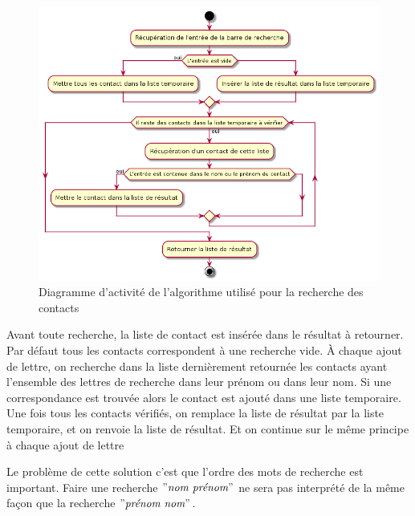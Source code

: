 \begin{figure}[!h]
	\centering
	\includegraphics[scale=0.6]{img/activity_retrieve_new.png}
	\caption{\label{activity_retrieve_new} {Diagramme d'activité de l'algorithme utilisé pour la recherche des contacts}}
\end{figure}

Avant toute recherche, la liste de contact est insérée dans le résultat à retourner. Par défaut tous les contacts correspondent à une recherche vide. À chaque ajout de lettre, on recherche dans la liste dernièrement retournée les contacts ayant l'ensemble des lettres de recherche dans leur prénom ou dans leur nom. Si une correspondance est trouvée alors le contact est ajouté dans une liste temporaire. Une fois tous les contacts vérifiés, on remplace la liste de résultat par la liste temporaire, et on renvoie la liste de résultat. Et on continue sur le même principe à chaque ajout de lettre

\newpage

Le problème de cette solution c'est que l'ordre des mots de recherche est important. Faire une recherche $"\textit{nom prénom}"$ ne sera pas interprété de la même façon que la recherche $"\textit{prénom nom}"$.

